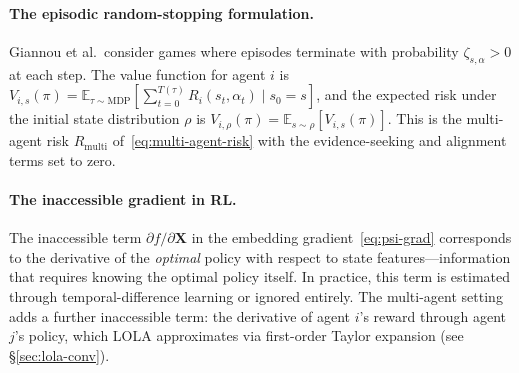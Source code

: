 \paragraph{The episodic random-stopping formulation.} Giannou et al.\ consider games where episodes terminate with probability $\zeta_{s,\alpha} > 0$ at each step. The value function for agent $i$ is $V_{i,s}(\pi) = \mathbb{E}_{\tau \sim \text{MDP}}[\sum_{t=0}^{T(\tau)} R_i(s_t, \alpha_t) \mid s_0 = s]$, and the expected risk under the initial state distribution $\rho$ is $V_{i,\rho}(\pi) = \mathbb{E}_{s \sim \rho}[V_{i,s}(\pi)]$. This is the multi-agent risk $R_{\mathrm{multi}}$ of~\eqref{eq:multi-agent-risk} with the evidence-seeking and alignment terms set to zero.

\paragraph{The inaccessible gradient in RL.} The inaccessible term $\partial f / \partial \mathbf{X}$ in the embedding gradient~\eqref{eq:psi-grad} corresponds to the derivative of the \emph{optimal} policy with respect to state features---information that requires knowing the optimal policy itself. In practice, this term is estimated through temporal-difference learning or ignored entirely. The multi-agent setting adds a further inaccessible term: the derivative of agent $i$'s reward through agent $j$'s policy, which LOLA approximates via first-order Taylor expansion (see \S\ref{sec:lola-conv}).

